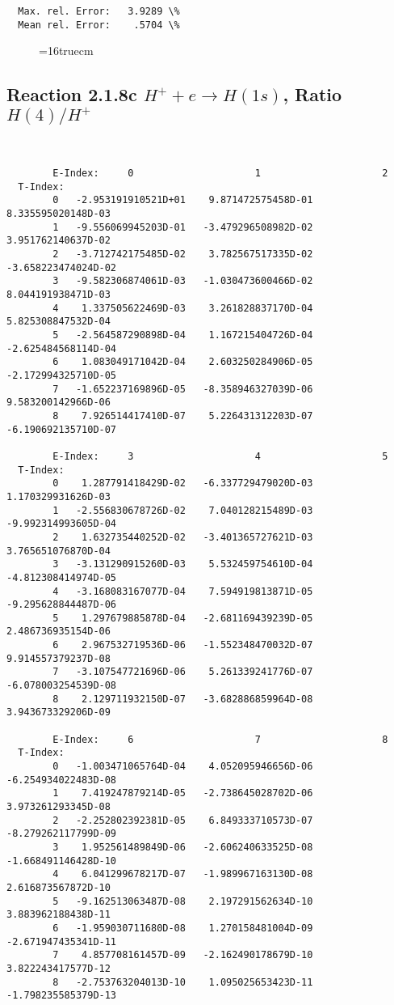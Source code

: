\documentclass[12pt,dvipdfmx]{article}
\begin{document}
{\begin{small}
\begin{verbatim}
  Max. rel. Error:   3.9289 \%
  Mean rel. Error:    .5704 \%

\end{verbatim}\end{small}
\begin{figure} \label{2.1.8rb}
\epsfxsize=16truecm
\end{figure}
\newpage



\subsection{
Reaction 2.1.8c  $H^+ + e \rightarrow H(1s) $,  Ratio $H(4)/H^+$
}

\begin{small}\begin{verbatim}


        E-Index:     0                     1                     2
  T-Index:
        0   -2.953191910521D+01    9.871472575458D-01    8.335595020148D-03
        1   -9.556069945203D-01   -3.479296508982D-02    3.951762140637D-02
        2   -3.712742175485D-02    3.782567517335D-02   -3.658223474024D-02
        3   -9.582306874061D-03   -1.030473600466D-02    8.044191938471D-03
        4    1.337505622469D-03    3.261828837170D-04    5.825308847532D-04
        5   -2.564587290898D-04    1.167215404726D-04   -2.625484568114D-04
        6    1.083049171042D-04    2.603250284906D-05   -2.172994325710D-05
        7   -1.652237169896D-05   -8.358946327039D-06    9.583200142966D-06
        8    7.926514417410D-07    5.226431312203D-07   -6.190692135710D-07

        E-Index:     3                     4                     5
  T-Index:
        0    1.287791418429D-02   -6.337729479020D-03    1.170329931626D-03
        1   -2.556830678726D-02    7.040128215489D-03   -9.992314993605D-04
        2    1.632735440252D-02   -3.401365727621D-03    3.765651076870D-04
        3   -3.131290915260D-03    5.532459754610D-04   -4.812308414974D-05
        4   -3.168083167077D-04    7.594919813871D-05   -9.295628844487D-06
        5    1.297679885878D-04   -2.681169439239D-05    2.486736935154D-06
        6    2.967532719536D-06   -1.552348470032D-07    9.914557379237D-08
        7   -3.107547721696D-06    5.261339241776D-07   -6.078003254539D-08
        8    2.129711932150D-07   -3.682886859964D-08    3.943673329206D-09

        E-Index:     6                     7                     8
  T-Index:
        0   -1.003471065764D-04    4.052095946656D-06   -6.254934022483D-08
        1    7.419247879214D-05   -2.738645028702D-06    3.973261293345D-08
        2   -2.252802392381D-05    6.849333710573D-07   -8.279262117799D-09
        3    1.952561489849D-06   -2.606240633525D-08   -1.668491146428D-10
        4    6.041299678217D-07   -1.989967163130D-08    2.616873567872D-10
        5   -9.162513063487D-08    2.197291562634D-10    3.883962188438D-11
        6   -1.959030711680D-08    1.270158481004D-09   -2.671947435341D-11
        7    4.857708161457D-09   -2.162490178679D-10    3.822243417577D-12
        8   -2.753763204013D-10    1.095025653423D-11   -1.798235585379D-13


\end{verbatim}
\end{small}}
\end{document}
